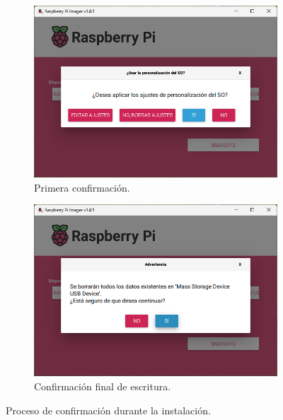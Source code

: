 \documentclass[12pt]{article}
\begin{document}
\begin{figure}[H]
    \centering
    \begin{subfigure}[b]{0.48\linewidth}
        \centering
        \includegraphics[width=\linewidth]{rpi_confirmacion1.png}
        \caption{Primera confirmación.}
        \label{fig:rpi_confirmacion1}
    \end{subfigure}
    \hfill
    \begin{subfigure}[b]{0.48\linewidth}
        \centering
        \includegraphics[width=\linewidth]{rpi_ultima_confirmacion.png}
        \caption{Confirmación final de escritura.}
        \label{fig:rpi_ultima_confirmacion}
    \end{subfigure}
    \caption{Proceso de confirmación durante la instalación.}
    \label{fig:rpi_confirmaciones}
\end{figure}
\end{document}
